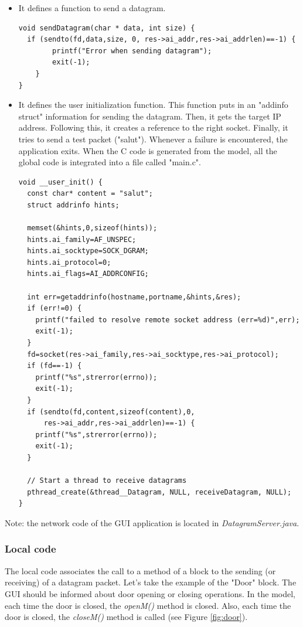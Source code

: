 \documentclass[12pt]{article}
\begin{document}
\begin{itemize}
\item It defines a function to send a datagram.
\begin{lstlisting}
void sendDatagram(char * data, int size) {
  if (sendto(fd,data,size, 0, res->ai_addr,res->ai_addrlen)==-1) {
        printf("Error when sending datagram");
        exit(-1);
    }
}
\end{lstlisting}
\item It defines the user initialization function. This function puts in an "addinfo struct" information for sending the datagram. Then, it gets the target IP address. Following this, it creates a reference to the right socket. Finally, it tries to send a test packet ("salut"). Whenever a failure is encountered, the application exits. When the C code is generated from the model, all the global code is integrated into a file called "main.c".
\begin{lstlisting}
void __user_init() { 
  const char* content = "salut";
  struct addrinfo hints;

  memset(&hints,0,sizeof(hints));
  hints.ai_family=AF_UNSPEC;
  hints.ai_socktype=SOCK_DGRAM;
  hints.ai_protocol=0;
  hints.ai_flags=AI_ADDRCONFIG;
 
  int err=getaddrinfo(hostname,portname,&hints,&res);
  if (err!=0) {
    printf("failed to resolve remote socket address (err=%d)",err);
    exit(-1);
  }
  fd=socket(res->ai_family,res->ai_socktype,res->ai_protocol);
  if (fd==-1) {
    printf("%s",strerror(errno));
    exit(-1);
  }
  if (sendto(fd,content,sizeof(content),0,
      res->ai_addr,res->ai_addrlen)==-1) {
    printf("%s",strerror(errno));
    exit(-1);
  }

  // Start a thread to receive datagrams
  pthread_create(&thread__Datagram, NULL, receiveDatagram, NULL);
}
\end{lstlisting}
\end{itemize}
Note: the network code of the GUI application is located in \textit{DatagramServer.java}.

\subsubsection{Local code}
The local code associates the call to a method of a block to the sending (or receiving) of a datagram packet. Let's take the example of the "Door" block. The GUI should be informed about door opening or closing operations. In the model, each time the door is closed, the \textit{openM()} method is closed. Also, each time the door is closed, the \textit{closeM() }method is called (see Figure \ref{fig:door}).
\end{document}
